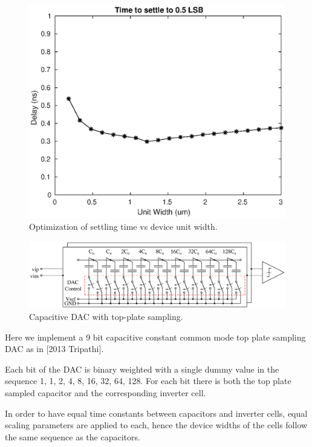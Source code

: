 \documentclass[10pt,journal]{IEEEtran}\usepackage{longtable}
\begin{document}
\begin{figure}[tbph]
\begin{center}
\includegraphics[width=1\columnwidth]{dac_optimization.eps}
\caption{Optimization of settling time vs device unit width.}
\label{fig:DacOptimization}
\end{center}
\end{figure}
\begin{figure}[tbph]
\begin{center}
\includegraphics[width=1\columnwidth]{CapDacV2.pdf}
\caption{Capacitive DAC with top-plate sampling.}
\label{fig:CapDac}
\end{center}
\end{figure}

Here we implement a 9 bit capacitive constant common mode top plate sampling DAC as in [2013 Tripathi].

Each bit of the DAC is binary weighted with a single dummy value in the
sequence 1, 1, 2, 4, 8, 16, 32, 64, 128.
For each bit there is both the top plate sampled capacitor and the corresponding inverter cell.

In order to have equal time constants between capacitors and inverter cells, equal scaling parameters are applied to each, hence the device widths of the cells follow the same sequence as the capacitors.
\end{document}
